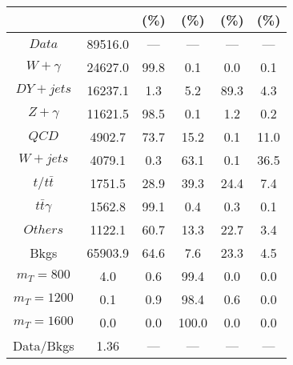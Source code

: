 \begin{figure}
\begin{minipage}[c]{0.32\textwidth}
{\begin{tabular}{cccccc}
 &  & (\%) & (\%) & (\%) & (\%)  \\
\hline
                                                                      $ Data $ &  89516.0 &  --- &  --- &  --- &  ---\\
$ W+\gamma $ &  24627.0 &  99.8 &  0.1 &  0.0 &  0.1\\
$ DY+jets $ &  16237.1 &  1.3 &  5.2 &  89.3 &  4.3\\
$ Z+\gamma $ &  11621.5 &  98.5 &  0.1 &  1.2 &  0.2\\
$ QCD $ &  4902.7 &  73.7 &  15.2 &  0.1 &  11.0\\
$ W+jets $ &  4079.1 &  0.3 &  63.1 &  0.1 &  36.5\\
$ t/t\bar{t} $ &  1751.5 &  28.9 &  39.3 &  24.4 &  7.4\\
$ t\bar{t}\gamma $ &  1562.8 &  99.1 &  0.4 &  0.3 &  0.1\\
$ Others $ &  1122.1 &  60.7 &  13.3 &  22.7 &  3.4\\
Bkgs &  65903.9 &  64.6 &  7.6 &  23.3 &  4.5\\
$ m_{T} = 800 $ &  4.0 &  0.6 &  99.4 &  0.0 &  0.0\\
$ m_{T} = 1200 $ &  0.1 &  0.9 &  98.4 &  0.6 &  0.0\\
$ m_{T} = 1600 $ &  0.0 &  0.0 &  100.0 &  0.0 &  0.0\\
Data/Bkgs &  1.36 &  --- &  --- &  --- &  ---\\
\hline
\end{tabular}
}
\end{minipage}
\end{figure}

